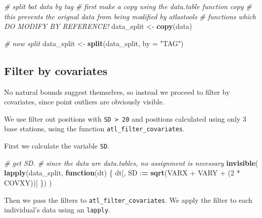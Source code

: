 \documentclass[]{scrartcl}
\newenvironment{Shaded}{}{}
\newcommand{\CommentTok}[1]{\textcolor[rgb]{0.38,0.63,0.69}{\textit{#1}}}
\newcommand{\ControlFlowTok}[1]{\textcolor[rgb]{0.00,0.44,0.13}{\textbf{#1}}}
\newcommand{\DataTypeTok}[1]{\textcolor[rgb]{0.56,0.13,0.00}{#1}}
\newcommand{\DecValTok}[1]{\textcolor[rgb]{0.25,0.63,0.44}{#1}}
\newcommand{\ErrorTok}[1]{\textcolor[rgb]{1.00,0.00,0.00}{\textbf{#1}}}
\newcommand{\KeywordTok}[1]{\textcolor[rgb]{0.00,0.44,0.13}{\textbf{#1}}}
\newcommand{\NormalTok}[1]{#1}
\newcommand{\OperatorTok}[1]{\textcolor[rgb]{0.40,0.40,0.40}{#1}}
\newcommand{\StringTok}[1]{\textcolor[rgb]{0.25,0.44,0.63}{#1}}
\begin{document}
\begin{Shaded}
\begin{Highlighting}[]
\CommentTok{# split bat data by tag}
\CommentTok{# first make a copy using the data.table function copy}
\CommentTok{# this prevents the orignal data from being modified by atlastools}
\CommentTok{# functions which DO MODIFY BY REFERENCE!}
\NormalTok{data_split <-}\StringTok{ }\KeywordTok{copy}\NormalTok{(data)}

\CommentTok{# now split}
\NormalTok{data_split <-}\StringTok{ }\KeywordTok{split}\NormalTok{(data_split, }\DataTypeTok{by =} \StringTok{"TAG"}\NormalTok{)}
\end{Highlighting}
\end{Shaded}

\hypertarget{filter-by-covariates}{%
\subsection{Filter by covariates}\label{filter-by-covariates}}

No natural bounds suggest themselves, so instead we proceed to filter by covariates, since point outliers are obviously visible.

We use filter out positions with \texttt{SD\ \textgreater{}\ 20} and positions calculated using only 3 base stations, using the function \texttt{atl\_filter\_covariates}.

First we calculate the variable \texttt{SD}.

\begin{Shaded}
\begin{Highlighting}[]
\CommentTok{# get SD.}
\CommentTok{# since the data are data.tables, no assignment is necessary}
\KeywordTok{invisible}\NormalTok{(}
  \KeywordTok{lapply}\NormalTok{(data_split, }\ControlFlowTok{function}\NormalTok{(dt) \{}
\NormalTok{    dt[, SD }\OperatorTok{:}\ErrorTok{=}\StringTok{ }\KeywordTok{sqrt}\NormalTok{(VARX }\OperatorTok{+}\StringTok{ }\NormalTok{VARY }\OperatorTok{+}\StringTok{ }\NormalTok{(}\DecValTok{2} \OperatorTok{*}\StringTok{ }\NormalTok{COVXY))]}
\NormalTok{  \})}
\NormalTok{)}
\end{Highlighting}
\end{Shaded}

Then we pass the filters to \texttt{atl\_filter\_covariates}.
We apply the filter to each individual's data using an \texttt{lapply}.
\end{document}

